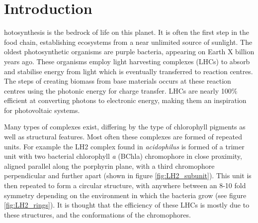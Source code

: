 %
%
\chapter{Introduction}
\label{chap:intro}

hotosynthesis is the bedrock of life on this planet. It is often the 
first step in the food chain, establishing ecosystems from a near unlimited source 
of sunlight. The oldest photosynthetic organisms are purple bacteria, appearing
on Earth X billion years ago. These organisms employ light harvesting complexes (LHCs) 
to absorb and stabilise energy from light which is eventually transferred to reaction
centres. The steps of creating biomass from base materials occurs at these reaction
centres using the photonic energy for charge transfer. LHCs are nearly 100\% efficient
at converting photons to electronic energy, making them an inspiration for photovoltaic 
systems.

Many types of complexes exist, differing by the type of chlorophyll pigments as 
well as structural features. Most often these complexes are formed of repeated units.
For example the LH2 complex found in \emph{acidophilus} is formed of a trimer unit
with two bacterial chlorophyll \emph{a} (BChla) chromophore in close proximity, 
aligned parallel along the porphyrin plane, with a third chromophore perpendicular
and further apart (shown in figure \ref{fig:LH2_subunit}). This unit is then repeated
to form a circular structure, with anywhere between an 8-10 fold symmetry depending 
on the environment in which the bacteria grow (see figure \ref{fig:LH2_rings}). 
It is thought that the efficiency of these LHCs is mostly due to these structures,
and the conformations of the chromophores.

